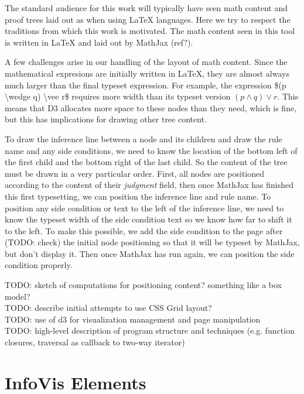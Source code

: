 \documentclass[conference]{IEEEtran}
\begin{document}
The standard audience for this work will typically have seen math content and proof trees laid out as when using \LaTeX{} languages. Here we try to respect the traditions from which this work is motivated. The math content seen in this tool is written in \LaTeX{} and laid out by MathJax (ref?).

A few challenges arise in our handling of the layout of math content. Since the mathematical expresions are initially written in \LaTeX{}, they are almost always much larger than the final typeset expression. For example, the expression \$(p \textbackslash wedge q) \textbackslash vee r\$ requires more width than its typeset version $(p \wedge q) \vee r$. This means that D3 allocates more space to these nodes than they need, which is fine, but this has implications for drawing other tree content.

To draw the inference line between a node and its children and draw the rule name and any side conditions, we need to know the location of the bottom left of the first child and the bottom right of the last child. So the content of the tree must be drawn in a very particular order. First, all nodes are positioned according to the content of their \textit{judgment} field, then once MathJax has finished this first typesetting, we can position the inference line and rule name. To position any side condition or text to the left of the inference line, we need to know the typeset width of the side condition text so we know how far to shift it to the left. To make this possible, we add the side condition to the page after (TODO: check) the initial node positioning so that it will be typeset by MathJax, but don't display it. Then once MathJax has run again, we can position the side condition properly.

TODO: sketch of computations for positioning content? something like a box model? \\

TODO: describe initial attempts to use CSS Grid layout? \\

TODO: use of d3 for visualization management and page manipulation \\

TODO: high-level description of program structure and techniques (e.g. function closures, traversal as callback to two-way iterator) \\


\section{InfoVis Elements}
\label{sec:infoviselem}
\end{document}
